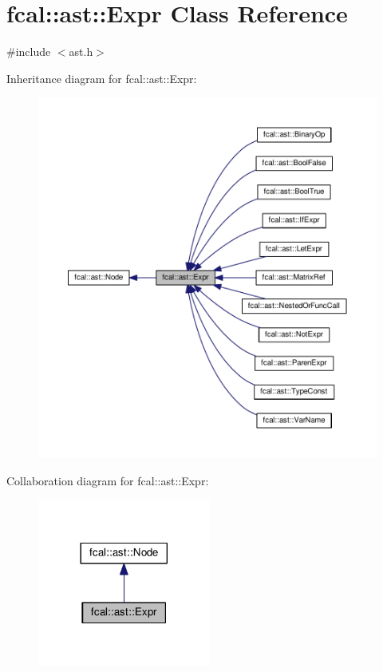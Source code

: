 \hypertarget{classfcal_1_1ast_1_1Expr}{}\section{fcal\+:\+:ast\+:\+:Expr Class Reference}
\label{classfcal_1_1ast_1_1Expr}


{\ttfamily \#include $<$ast.\+h$>$}



Inheritance diagram for fcal\+:\+:ast\+:\+:Expr\+:\nopagebreak
\begin{figure}[H]
\begin{center}
\leavevmode
\includegraphics[width=350pt]{classfcal_1_1ast_1_1Expr__inherit__graph}
\end{center}
\end{figure}


Collaboration diagram for fcal\+:\+:ast\+:\+:Expr\+:\nopagebreak
\begin{figure}[H]
\begin{center}
\leavevmode
\includegraphics[width=161pt]{classfcal_1_1ast_1_1Expr__coll__graph}
\end{center}
\end{figure}
